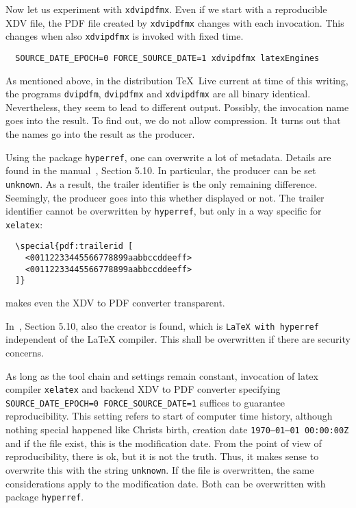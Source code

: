 \documentclass[a4paper, english]{article}%
\newcommand{\xelatex}{\texttt{xelatex}}
\newcommand{\texlive}{\TeX~Live}
\begin{document}
Now let us experiment with \texttt{xdvipdfmx}. 
Even if we start with a reproducible XDV file, 
the PDF file created by \texttt{xdvipdfmx} 
changes with each invocation. 
This changes when also \texttt{xdvipdfmx} is invoked with fixed time. 
%
\begin{verbatim}
  SOURCE_DATE_EPOCH=0 FORCE_SOURCE_DATE=1 xdvipdfmx latexEngines
\end{verbatim}

As mentioned above, in the distribution \texlive{} current at time of this writing, 
the programs \texttt{dvipdfm}, \texttt{dvipdfmx} and \texttt{xdvipdfmx} 
are all binary identical. 
Nevertheless, they seem to lead to different output. 
Possibly, the invocation name goes into the result. 
To find out, we do not allow compression. 
It turns out that the names go into the result as the producer. 

Using the package \texttt{hyperref}, 
one can overwrite a lot of metadata. 
Details are found in the manual~\cite{HyperTextP}, Section 5.10. 
In particular, the producer can be set \texttt{unknown}. 
As a result, the trailer identifier is the only remaining difference. 
Seemingly, the producer goes into this whether displayed or not. 
The trailer identifier cannot be overwritten by \texttt{hyperref}, 
but only in a way specific for \xelatex: 
%
\begin{verbatim}
  \special{pdf:trailerid [
    <00112233445566778899aabbccddeeff>
    <00112233445566778899aabbccddeeff>
  ]}  
\end{verbatim}
%
makes even the XDV to PDF converter transparent. 

In~\cite{HyperTextP}, Section 5.10, also the creator is found, 
which is \texttt{LaTeX with hyperref} independent of the \LaTeX{} compiler. 
This shall be overwritten if there are security concerns. 

As long as the tool chain and settings remain constant, 
invocation of latex compiler \xelatex{} and backend XDV to PDF converter 
specifying \texttt{SOURCE\_DATE\_EPOCH=0 FORCE\_SOURCE\_DATE=1} 
suffices to guarantee reproducibility. 
This setting refers to start of computer time history, 
although nothing special happened like Christs birth,
creation date \texttt{1970--01--01 00:00:00Z} 
and if the file exist, this is the modification date. 
From the point of view of reproducibility, 
there is ok, but it is not the truth. 
Thus, it makes sense to overwrite this with the string \texttt{unknown}. 
If the file is overwritten, the same considerations apply to the modification date. 
Both can be overwritten with package \texttt{hyperref}. 
\end{document}
